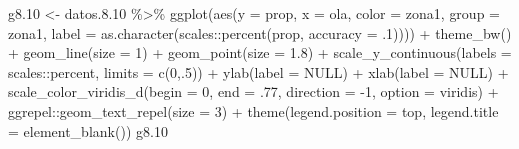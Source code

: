 \documentclass[
  12pt,
]{book}
\newenvironment{Shaded}{\begin{snugshade}}{\end{snugshade}}
\newcommand{\AttributeTok}[1]{\textcolor[rgb]{0.77,0.63,0.00}{#1}}
\newcommand{\ConstantTok}[1]{\textcolor[rgb]{0.00,0.00,0.00}{#1}}
\newcommand{\DecValTok}[1]{\textcolor[rgb]{0.00,0.00,0.81}{#1}}
\newcommand{\FloatTok}[1]{\textcolor[rgb]{0.00,0.00,0.81}{#1}}
\newcommand{\FunctionTok}[1]{\textcolor[rgb]{0.00,0.00,0.00}{#1}}
\newcommand{\NormalTok}[1]{#1}
\newcommand{\OtherTok}[1]{\textcolor[rgb]{0.56,0.35,0.01}{#1}}
\newcommand{\SpecialCharTok}[1]{\textcolor[rgb]{0.00,0.00,0.00}{#1}}
\newcommand{\StringTok}[1]{\textcolor[rgb]{0.31,0.60,0.02}{#1}}
\begin{document}
\begin{Shaded}
\begin{Highlighting}[]
\NormalTok{g8}\FloatTok{.10} \OtherTok{\textless{}{-}}\NormalTok{ datos.}\FloatTok{8.10} \SpecialCharTok{\%\textgreater{}\%} 
  \FunctionTok{ggplot}\NormalTok{(}\FunctionTok{aes}\NormalTok{(}\AttributeTok{y =}\NormalTok{ prop, }\AttributeTok{x =}\NormalTok{ ola, }\AttributeTok{color =}\NormalTok{ zona1, }\AttributeTok{group =}\NormalTok{ zona1,}
             \AttributeTok{label =} \FunctionTok{as.character}\NormalTok{(scales}\SpecialCharTok{::}\FunctionTok{percent}\NormalTok{(prop, }\AttributeTok{accuracy =}\NormalTok{ .}\DecValTok{1}\NormalTok{)))) }\SpecialCharTok{+}
  \FunctionTok{theme\_bw}\NormalTok{() }\SpecialCharTok{+}   
  \FunctionTok{geom\_line}\NormalTok{(}\AttributeTok{size =} \DecValTok{1}\NormalTok{) }\SpecialCharTok{+}
  \FunctionTok{geom\_point}\NormalTok{(}\AttributeTok{size =} \FloatTok{1.8}\NormalTok{) }\SpecialCharTok{+}
  \FunctionTok{scale\_y\_continuous}\NormalTok{(}\AttributeTok{labels =}\NormalTok{ scales}\SpecialCharTok{::}\NormalTok{percent,}
                     \AttributeTok{limits =} \FunctionTok{c}\NormalTok{(}\DecValTok{0}\NormalTok{,.}\DecValTok{5}\NormalTok{)) }\SpecialCharTok{+}
  \FunctionTok{ylab}\NormalTok{(}\AttributeTok{label =} \ConstantTok{NULL}\NormalTok{) }\SpecialCharTok{+}
  \FunctionTok{xlab}\NormalTok{(}\AttributeTok{label =} \ConstantTok{NULL}\NormalTok{) }\SpecialCharTok{+}
  \FunctionTok{scale\_color\_viridis\_d}\NormalTok{(}\AttributeTok{begin =} \DecValTok{0}\NormalTok{, }\AttributeTok{end =}\NormalTok{ .}\DecValTok{77}\NormalTok{, }\AttributeTok{direction =} \SpecialCharTok{{-}}\DecValTok{1}\NormalTok{, }\AttributeTok{option =} \StringTok{\textquotesingle{}viridis\textquotesingle{}}\NormalTok{) }\SpecialCharTok{+}
\NormalTok{  ggrepel}\SpecialCharTok{::}\FunctionTok{geom\_text\_repel}\NormalTok{(}\AttributeTok{size =} \DecValTok{3}\NormalTok{) }\SpecialCharTok{+}
  \FunctionTok{theme}\NormalTok{(}\AttributeTok{legend.position =} \StringTok{\textquotesingle{}top\textquotesingle{}}\NormalTok{,}
        \AttributeTok{legend.title =} \FunctionTok{element\_blank}\NormalTok{())}
\NormalTok{g8}\FloatTok{.10}
\end{Highlighting}
\end{Shaded}
\end{document}
